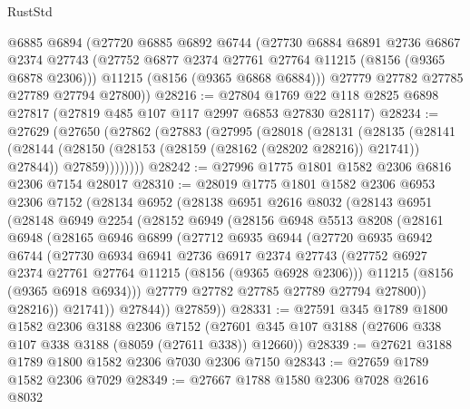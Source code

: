 \begin{lexlean}{RustStd}
\begin{coremodule}
{\begin{coremodule}
{{{{{{{{{{{{{{{{{{{{{{{{{{{{{{{{{{      @6885
      @6894
      (@27720
        @6885
        @6892
        @6744
        (@27730
          @6884
          @6891
          @2736
          @6867
          @2374
          @27743
          (@27752 @6877 @2374 @27761 @27764 @11215 (@8156 (@9365 @6878 @2306)))
          @11215
          (@8156 (@9365 @6868 @6884)))
        @27779
        @27782
        @27785
        @27789
        @27794
        @27800))
@28216 := @27804 @1769 @22 @118 @2825 @6898 @27817 (@27819 @485 @107 @117 @2997 @6853 @27830 @28117)
@28234 := @27629
    (@27650
      (@27862
        (@27883
          (@27995
            (@28018
              (@28131
                (@28135
                  (@28141
                    (@28144 (@28150 (@28153 (@28159 (@28162 (@28202 @28216)) @21741)) @27844))
                    @27859))))))))
@28242 := @27996 @1775 @1801 @1582 @2306 @6816 @2306 @7154 @28017
@28310 := @28019
    @1775
    @1801
    @1582
    @2306
    @6953
    @2306
    @7152
    (@28134
      @6952
      (@28138
        @6951
        @2616
        @8032
        (@28143
          @6951
          (@28148
            @6949
            @2254
            (@28152
              @6949
              (@28156
                @6948
                @5513
                @8208
                (@28161
                  @6948
                  (@28165
                    @6946
                    @6899
                    (@27712
                      @6935
                      @6944
                      (@27720
                        @6935
                        @6942
                        @6744
                        (@27730
                          @6934
                          @6941
                          @2736
                          @6917
                          @2374
                          @27743
                          (@27752 @6927 @2374 @27761 @27764 @11215 (@8156 (@9365 @6928 @2306)))
                          @11215
                          (@8156 (@9365 @6918 @6934)))
                        @27779
                        @27782
                        @27785
                        @27789
                        @27794
                        @27800))
                    @28216))
                @21741))
            @27844))
        @27859))
@28331 := @27591
    @345
    @1789
    @1800
    @1582
    @2306
    @3188
    @2306
    @7152
    (@27601 @345 @107 @3188 (@27606 @338 @107 @338 @3188 (@8059 (@27611 @338)) @12660))
@28339 := @27621 @3188 @1789 @1800 @1582 @2306 @7030 @2306 @7150
@28343 := @27659 @1789 @1582 @2306 @7029
@28349 := @27667 @1788 @1580 @2306 @7028 @2616 @8032
}}}}}}}}}}}}}}}}}}}}}}}}}}}}}}}}}}
\end{coremodule}}
\end{coremodule}
\end{lexlean}
